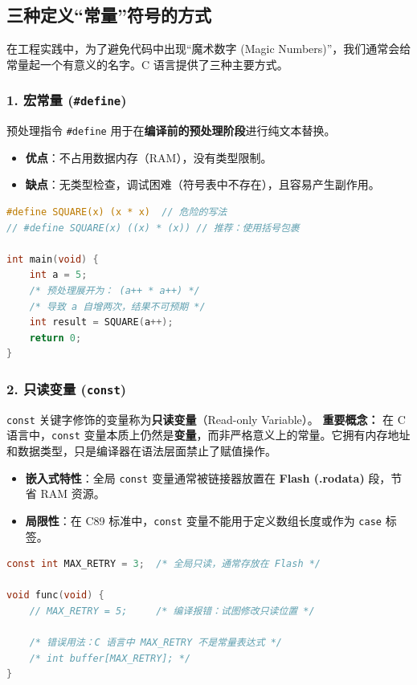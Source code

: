 \subsection{三种定义“常量”符号的方式}

在工程实践中，为了避免代码中出现“魔术数字 (Magic Numbers)”，我们通常会给常量起一个有意义的名字。C 语言提供了三种主要方式。

\subsubsection{1. 宏常量 (\texttt{\#define})}
预处理指令 \texttt{\#define} 用于在\textbf{编译前的预处理阶段}进行纯文本替换。

\begin{itemize}
    \item \textbf{优点}：不占用数据内存（RAM），没有类型限制。
    \item \textbf{缺点}：无类型检查，调试困难（符号表中不存在），且容易产生副作用。
\end{itemize}

\begin{lstlisting}[language=C, caption={宏常量的使用与副作用}, label={lst:define_side_effect}]
#define SQUARE(x) (x * x)  // 危险的写法
// #define SQUARE(x) ((x) * (x)) // 推荐：使用括号包裹

int main(void) {
    int a = 5;
    /* 预处理展开为： (a++ * a++) */
    /* 导致 a 自增两次，结果不可预期 */
    int result = SQUARE(a++); 
    return 0;
}
\end{lstlisting}

\subsubsection{2. 只读变量 (\texttt{const})}
\texttt{const} 关键字修饰的变量称为\textbf{只读变量}（Read-only Variable）。
\textbf{重要概念：} 在 C 语言中，\texttt{const} 变量本质上仍然是\textbf{变量}，而非严格意义上的常量。它拥有内存地址和数据类型，只是编译器在语法层面禁止了赋值操作。

\begin{itemize}
    \item \textbf{嵌入式特性}：全局 \texttt{const} 变量通常被链接器放置在 \textbf{Flash (.rodata)} 段，节省 RAM 资源。
    \item \textbf{局限性}：在 C89 标准中，\texttt{const} 变量不能用于定义数组长度或作为 \texttt{case} 标签。
\end{itemize}

\begin{lstlisting}[language=C, caption={const 只读变量}, label={lst:const_var}]
const int MAX_RETRY = 3;  /* 全局只读，通常存放在 Flash */

void func(void) {
    // MAX_RETRY = 5;     /* 编译报错：试图修改只读位置 */
    
    /* 错误用法：C 语言中 MAX_RETRY 不是常量表达式 */
    /* int buffer[MAX_RETRY]; */ 
}
\end{lstlisting}

